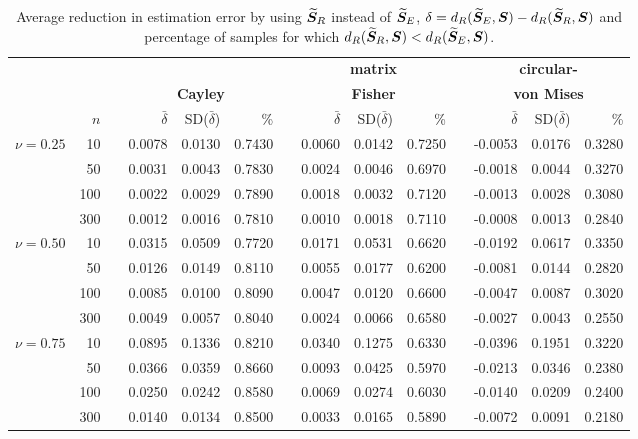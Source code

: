 \begin{table}[h]
\caption{Average reduction in estimation error by using ${\widetilde{\bm S}_R}$ instead of ${\widetilde{\bm S}_E}$, $\delta={d_R}({\widetilde{\bm S}_E},\bm S) - {d_R}({\widetilde{\bm S}_R},\bm S)$ and percentage of samples for which ${d_R}({\widetilde{\bm S}_R},\bm S) < {d_R}({\widetilde{\bm S}_E},\bm S)$.}
\label{tab:percL1}
\begin{center}
\begin{tabular}{rrcrrrcrrrcrrr}
  \hline
  &&&\multicolumn{3}{c}{} & &\multicolumn{3}{c}{\textbf{matrix} } &&\multicolumn{3}{c}{\textbf{circular-}}\\
    &&&\multicolumn{3}{c}{\textbf{Cayley}} & &\multicolumn{3}{c}{\textbf{Fisher}} & &\multicolumn{3}{c}{\textbf{von Mises}}\\ 
\rule[2mm]{0mm}{3mm} 
  &  $n$ && $\bar{\delta}$&SD($\bar\delta$) & \% & & $\bar{\delta}$&SD($\bar\delta$) & \% & & $\bar{\delta}$&SD($\bar\delta$) & \% \\ 
  \hline \hline
  \multirow{4}{*}{$\nu=0.25$} 
 &    10 && 0.0078 & 0.0130 & 0.7430 && 0.0060 & 0.0142 & 0.7250 && -0.0053 & 0.0176 & 0.3280 \\ 
 &    50 && 0.0031 & 0.0043 & 0.7830 && 0.0024 & 0.0046 & 0.6970 && -0.0018 & 0.0044 & 0.3270 \\ 
 &   100 && 0.0022 & 0.0029 & 0.7890 && 0.0018 & 0.0032 & 0.7120 && -0.0013 & 0.0028 & 0.3080 \\ 
 &   300 && 0.0012 & 0.0016 & 0.7810 && 0.0010 & 0.0018 & 0.7110 && -0.0008 & 0.0013 & 0.2840 \\ \hline
  \multirow{4}{*}{$\nu=0.50$} 
  &    10 && 0.0315 & 0.0509 & 0.7720 && 0.0171 & 0.0531 & 0.6620 && -0.0192 & 0.0617 & 0.3350 \\ 
  &    50 && 0.0126 & 0.0149 & 0.8110 && 0.0055 & 0.0177 & 0.6200 && -0.0081 & 0.0144 & 0.2820 \\ 
  &   100 && 0.0085 & 0.0100 & 0.8090 && 0.0047 & 0.0120 & 0.6600 && -0.0047 & 0.0087 & 0.3020 \\ 
  &   300 && 0.0049 & 0.0057 & 0.8040 && 0.0024 & 0.0066 & 0.6580 && -0.0027 & 0.0043 & 0.2550 \\ \hline
   \multirow{4}{*}{$\nu=0.75$} 
  &    10 && 0.0895 & 0.1336 & 0.8210 && 0.0340 & 0.1275 & 0.6330 && -0.0396 & 0.1951 & 0.3220 \\ 
  &    50 && 0.0366 & 0.0359 & 0.8660 && 0.0093 & 0.0425 & 0.5970 && -0.0213 & 0.0346 & 0.2380 \\ 
  &   100 && 0.0250 & 0.0242 & 0.8580 && 0.0069 & 0.0274 & 0.6030 && -0.0140 & 0.0209 & 0.2400 \\ 
  &   300 && 0.0140 & 0.0134 & 0.8500 && 0.0033 & 0.0165 & 0.5890 && -0.0072 & 0.0091 & 0.2180 \\   \hline
\end{tabular}
\end{center}
\end{table}

